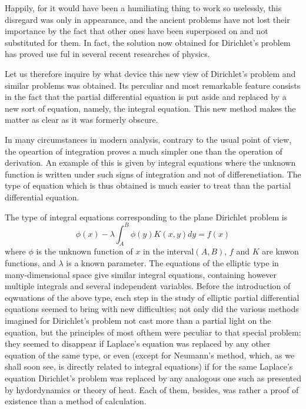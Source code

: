 \documentclass[12pt,oneside]{book}
\begin{document}
Happily, for it would have been a humiliating thing to work so uselessly, this disregard was only in appearance, and the ancient problems have not lost their importance by the fact that other ones have been superposed on and not substituted for them. In fact, the solution now obtained for Dirichlet's problem has proved use ful in several recent researches of physics. \par

Let us therefore inquire by what device this new view of Dirichlet's problem and similar problems was obtained. Its perculiar and most remarkable feature consists in the fact that the partial differential equation is put aside and replaced by a new sort of equation, namely, the integral equation. This new method makes the matter as clear as it was formerly obscure. \par

In many circumstances in modern analysis, contrary to the usual point of view, the opeartion of integration proves a much simpler one than the operation of derivation. An example of this is given by integral equations where the unknown function is written under such signs of integration and not of differenetiation. The type of equation which is thus obtained is much easier to treat than the partial differential equation. \par

The type of integral equations corresponding to the plane Dirichlet problem is
\begin{equation}
    \label{2.1}
    \phi(x)-\lambda\int_A^B\phi(y)K(x,y)dy=f(x)
\end{equation}
where $\phi$ is the unknown function of $x$ in the interval$(A,B)$, $f$ and $K$ are knwon functions, and $\lambda$ is a known parameter. The equations of the elliptic type in many-dimensional space give similar integral equations, containing however multiple integrals and several independent variables. Before the introduction of eqwuations of the above type, each step in the study of elliptic partial differential equations seemed to bring with new difficulties; not only did the various methods imagined for Dirichlet's problem not cast more than a partial light on the equation, but the principles of most ofthem were peculiar to that special problem: they seemed to disappear if Laplace's equation was replaced by any other equation of the same type, or even (except for Neumann's method, which, as we shall soon see, is directly related to integral equations) if for the same Laplace's equation Dirichlet's problem was replaced by any analogous one such as presented by hydordynamics or theory of heat. Each of them, besides, was rather a proof of existence than a method of calculation. \par
\end{document}
